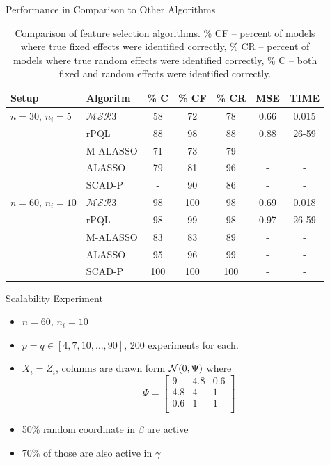 \documentclass[8pt]{beamer}
\newcommand{\ouralgo}{\ensuremath{\mathcal{MSR}3}}
\begin{document}
\begin{frame}{Performance in Comparison to Other Algorithms}
\begin{table}[H]
\begin{center}
\begin{tabular}{|l|l|c|c|c|c|c|}
\hline
Setup & Algoritm & \% C & \% CF & \% CR & MSE & TIME \\
\hline 
\hline
$n = 30$, $n_i = 5$ & \textbf{\ouralgo} & 58 & 72 & 78 & 0.66 & 0.015 \\
& rPQL & 88 & 98 & 88 & 0.88 & 26-59 \\ 
& M-ALASSO & 71 & 73 & 79 & - & -\\
& ALASSO & 79 & 81 & 96 & - & - \\
& SCAD-P & - & 90 & 86 & - & - \\
\hline 
$n = 60$, $n_i = 10$ & \textbf{\ouralgo} & 98 & 100  & 98 & 0.69& 0.018 \\
& rPQL & 98 & 99 & 98 & 0.97 &  26-59 \\ 
& M-ALASSO & 83 & 83 & 89 & - & - \\
& ALASSO & 95 & 96 & 99 & - & -\\
& SCAD-P & 100 & 100 & 100 & - & - \\
\hline
	
\end{tabular}
\end{center}
\caption{\label{table:krishna_setup_results} Comparison of feature selection algorithms. \% CF -- percent of models where true fixed effects were identified correctly, \% CR -- percent of models where true random effects were identified correctly, \% C -- both fixed and random effects were identified correctly.}	
\end{table}
	
\end{frame}

\begin{frame}{Scalability Experiment}
\begin{itemize}
	\item $n = 60$, $n_i = 10$
	\item $p = q \in [4, 7, 10, \dots, 90]$, 200 experiments for each.
	\item $X_i = Z_i$, columns are drawn form $\operatorname{\mathcal{N}}(0, \Psi)$ where
	\[
		\Psi = \begin{bmatrix}
			9 & 4.8 & 0.6 \\
			4.8 & 4 & 1 \\
			0.6 & 1 & 1 \\
		\end{bmatrix}
	\]
	\item 50\% random coordinate in $\beta$ are active
	\item 70\% of those are also active in $\gamma$
\end{itemize}
\end{frame}
\end{document}
